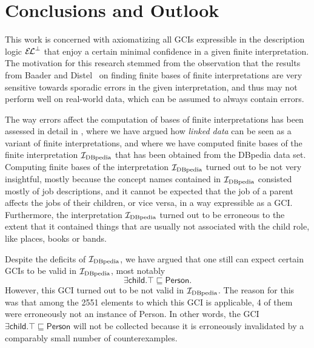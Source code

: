 \chapter{Conclusions and Outlook}
\label{cha:conclusions}

This work is concerned with axiomatizing all GCIs expressible in the description logic
${{\mathcal{E}\kern-.3ex\mathcal{L}}^\bot}$ that enjoy a certain minimal confidence in a given finite interpretation.  The
motivation for this research stemmed from the observation that the results from Baader and
Distel~\cite{Diss-Felix} on finding finite bases of finite interpretations are very
sensitive towards sporadic errors in the given interpretation, and thus may not perform
well on real-world data, which can be assumed to always contain errors.

The way errors affect the computation of bases of finite interpretations has been assessed
in detail in , where we have argued how \emph{linked data}
can be seen as a variant of finite interpretations, and where we have computed finite
bases of the finite interpretation ${\mathcal{I}_{\text{DBpedia}}}$ that has been obtained from the DBpedia
data set.  Computing finite bases of the interpretation ${\mathcal{I}_{\text{DBpedia}}}$ turned out to be not
very insightful, mostly because the concept names contained in ${\mathcal{I}_{\text{DBpedia}}}$ consisted
mostly of job descriptions, and it cannot be expected that the job of a parent affects the
jobs of their children, or vice versa, in a way expressible as a GCI.  Furthermore, the
interpretation ${\mathcal{I}_{\text{DBpedia}}}$ turned out to be erroneous to the extent that it contained
things that are usually not associated with the \textsf{child} role, like places, books or
bands.

Despite the deficits of ${\mathcal{I}_{\text{DBpedia}}}$, we have argued that one still can expect certain GCIs
to be valid in ${\mathcal{I}_{\text{DBpedia}}}$, most notably
\begin{equation*}
  \exists \mathsf{child}. \top \sqsubseteq \mathsf{Person}.
\end{equation*}
However, this GCI turned out to be not valid in ${\mathcal{I}_{\text{DBpedia}}}$.  The reason for this was that
among the 2551 elements to which this GCI is applicable, 4 of them were erroneously not an
instance of \textsf{Person}.  In other words, the GCI $\exists \mathsf{child}. \top
\sqsubseteq \mathsf{Person}$ will not be collected because it is erroneously invalidated
by a comparably small number of counterexamples.

